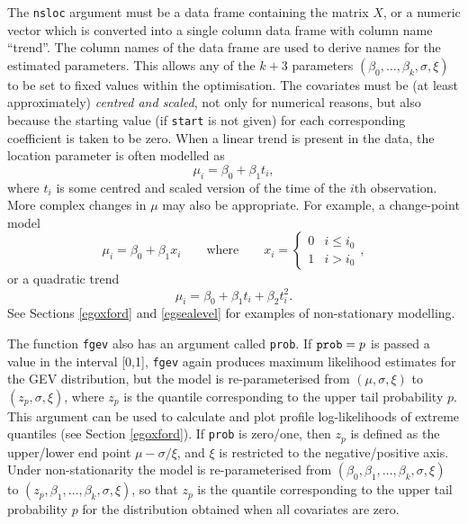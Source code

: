 \documentclass[11pt,a4paper]{article}
\begin{document}
The \verb+nsloc+ argument must be a data frame containing the matrix $X$, or a numeric vector which is converted into a single column data frame with column name ``trend''.
The column names of the data frame are used to derive names for the estimated parameters.
This allows any of the $k+3$ parameters $(\beta_0,\dots,\beta_k,\sigma,\xi)$ to be set to fixed values within the optimisation.  
The covariates must be (at least approximately) \emph{centred and scaled}, not only for numerical reasons, but also because the starting value (if \verb+start+ is not given) for each corresponding coefficient is taken to be zero.
When a linear trend is present in the data, the location parameter is often modelled as 
\begin{equation*}
\mu_i = \beta_0 + \beta_1t_i,
\end{equation*}
where $t_i$ is some centred and scaled version of the time of the $i$th observation.
More complex changes in $\mu$ may also be appropriate.
For example, a change-point model   
\begin{equation*}
\mu_i = \beta_0 + \beta_1x_i \qquad \text{where} \qquad
x_i = 
\begin{cases}
0 & i \leq i_0 \\
1 & i > i_0
\end{cases},
\end{equation*}
or a quadratic trend
\begin{equation*}
\mu_i = \beta_0 + \beta_1t_i + \beta_2t_i^2.
\end{equation*}
See Sections \ref{egoxford} and \ref{egsealevel} for examples of non-stationary modelling. 

The function \verb+fgev+ also has an argument called \verb+prob+.
If $\verb+prob+ = p$ is passed a value in the interval [0,1], \verb+fgev+ again produces maximum likelihood estimates for the GEV distribution, but the model is re-parameterised from $(\mu,\sigma,\xi)$ to $(z_p,\sigma,\xi)$, where $z_p$ is the quantile corresponding to the upper tail probability $p$. This argument can be used to calculate and plot profile log-likelihoods of extreme quantiles (see Section \ref{egoxford}).
If \verb+prob+ is zero/one, then $z_p$ is defined as the upper/lower end point $\mu - \sigma/\xi$, and $\xi$ is restricted to the negative/positive axis.
Under non-stationarity the model is re-parameterised from $(\beta_0,\beta_1,\dots,\beta_k,\sigma,\xi)$ to $(z_p,\beta_1,\dots,\beta_k,\sigma,\xi)$, so that $z_p$ is the quantile corresponding to the upper tail probability $p$ for the distribution obtained when all covariates are zero.
\end{document}
